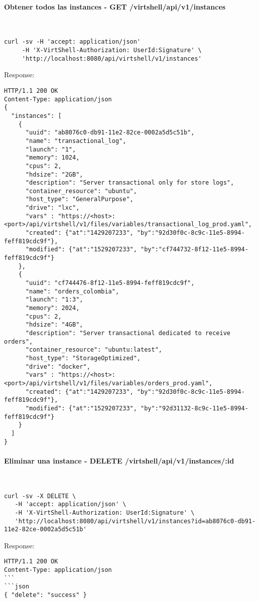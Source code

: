 \paragraph{Obtener todos las instances - GET /virtshell/api/v1/instances} ~\\

\begin{lstlisting}[style=json]
curl -sv -H 'accept: application/json' 
     -H 'X-VirtShell-Authorization: UserId:Signature' \ 
     'http://localhost:8080/api/virtshell/v1/instances'
\end{lstlisting}

Response:

\begin{lstlisting}[style=json]
HTTP/1.1 200 OK
Content-Type: application/json
{
  "instances": [
    {
      "uuid": "ab8076c0-db91-11e2-82ce-0002a5d5c51b",
      "name": "transactional_log",
      "launch": "1",
      "memory": 1024,
      "cpus": 2,
      "hdsize": "2GB",
      "description": "Server transactional only for store logs", 
      "container_resource": "ubuntu",
      "host_type": "GeneralPurpose",
      "drive": "lxc",
      "vars" : "https://<host>:<port>/api/virtshell/v1/files/variables/transactional_log_prod.yaml",
      "created": {"at":"1429207233", "by":"92d30f0c-8c9c-11e5-8994-feff819cdc9f"},
      "modified": {"at":"1529207233", "by":"cf744732-8f12-11e5-8994-feff819cdc9f"}
    },
    { 
      "uuid": "cf744476-8f12-11e5-8994-feff819cdc9f",
      "name": "orders_colombia",
      "launch": "1:3",
      "memory": 2024,
      "cpus": 2,
      "hdsize": "4GB",
      "description": "Server transactional dedicated to receive orders", 
      "container_resource": "ubuntu:latest",
      "host_type": "StorageOptimized",
      "drive": "docker",
      "vars" : "https://<host>:<port>/api/virtshell/v1/files/variables/orders_prod.yaml",
      "created": {"at":"1429207233", "by":"92d30f0c-8c9c-11e5-8994-feff819cdc9f"},
      "modified": {"at":"1529207233", "by":"92d31132-8c9c-11e5-8994-feff819cdc9f"}
    }    
  ]
}
\end{lstlisting}

\paragraph{Eliminar una instance - DELETE /virtshell/api/v1/instances/:id} ~\\

\begin{lstlisting}[style=json]
curl -sv -X DELETE \
   -H 'accept: application/json' \
   -H 'X-VirtShell-Authorization: UserId:Signature' \
   'http://localhost:8080/api/virtshell/v1/instances?id=ab8076c0-db91-11e2-82ce-0002a5d5c51b'
\end{lstlisting}

Response:

\begin{lstlisting}[style=json]
HTTP/1.1 200 OK
Content-Type: application/json
```
```json
{ "delete": "success" }
\end{lstlisting}